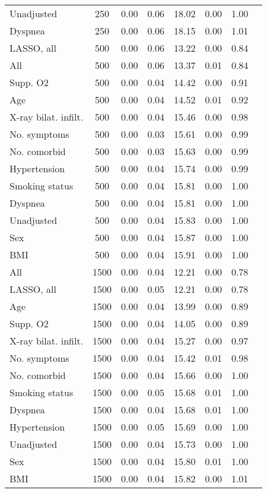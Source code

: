 \documentclass{article}
\begin{document}
{\begin{longtable}{lccccccc}
Unadjusted & 250 & 0.00 & 0.06 & 18.02 &  0.00 & 1.00 \\ 
Dyspnea & 250 & 0.00 & 0.06 & 18.15 &  0.00 & 1.01 \\ \midrule 
LASSO, all & 500 & 0.00 & 0.06 & 13.22 &  0.00 & 0.84 \\ 
All & 500 & 0.00 & 0.06 & 13.37 &  0.01 & 0.84 \\ 
Supp. O2 & 500 & 0.00 & 0.04 & 14.42 &  0.00 & 0.91 \\ 
Age & 500 & 0.00 & 0.04 & 14.52 &  0.01 & 0.92 \\ 
X-ray bilat. infilt. & 500 & 0.00 & 0.04 & 15.46 &  0.00 & 0.98 \\ 
No. symptoms & 500 & 0.00 & 0.03 & 15.61 &  0.00 & 0.99 \\ 
No. comorbid & 500 & 0.00 & 0.03 & 15.63 &  0.00 & 0.99 \\ 
Hypertension & 500 & 0.00 & 0.04 & 15.74 &  0.00 & 0.99 \\ 
Smoking status & 500 & 0.00 & 0.04 & 15.81 &  0.00 & 1.00 \\ 
Dyspnea & 500 & 0.00 & 0.04 & 15.81 &  0.00 & 1.00 \\ 
Unadjusted & 500 & 0.00 & 0.04 & 15.83 &  0.00 & 1.00 \\ 
Sex & 500 & 0.00 & 0.04 & 15.87 &  0.00 & 1.00 \\ 
BMI & 500 & 0.00 & 0.04 & 15.91 &  0.00 & 1.00 \\ \midrule 
All & 1500 & 0.00 & 0.04 & 12.21 &  0.00 & 0.78 \\ 
LASSO, all & 1500 & 0.00 & 0.05 & 12.21 &  0.00 & 0.78 \\ 
Age & 1500 & 0.00 & 0.04 & 13.99 &  0.00 & 0.89 \\ 
Supp. O2 & 1500 & 0.00 & 0.04 & 14.05 &  0.00 & 0.89 \\ 
X-ray bilat. infilt. & 1500 & 0.00 & 0.04 & 15.27 &  0.00 & 0.97 \\ 
No. symptoms & 1500 & 0.00 & 0.04 & 15.42 &  0.01 & 0.98 \\ 
No. comorbid & 1500 & 0.00 & 0.04 & 15.66 &  0.00 & 1.00 \\ 
Smoking status & 1500 & 0.00 & 0.05 & 15.68 &  0.01 & 1.00 \\ 
Dyspnea & 1500 & 0.00 & 0.04 & 15.68 &  0.01 & 1.00 \\ 
Hypertension & 1500 & 0.00 & 0.05 & 15.69 &  0.00 & 1.00 \\ 
Unadjusted & 1500 & 0.00 & 0.04 & 15.73 &  0.00 & 1.00 \\ 
Sex & 1500 & 0.00 & 0.04 & 15.80 &  0.01 & 1.00 \\ 
BMI & 1500 & 0.00 & 0.04 & 15.82 &  0.00 & 1.01 \\
\bottomrule
\hline
\end{longtable}
}
\end{document}
